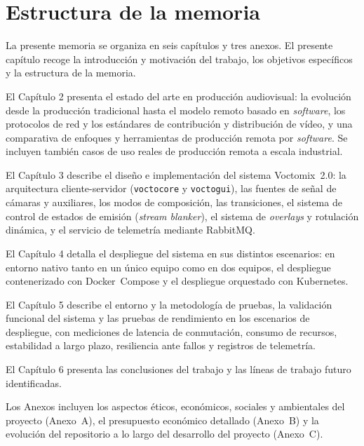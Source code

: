 \section{Estructura de la memoria}

La presente memoria se organiza en seis capítulos y tres anexos. El presente capítulo
recoge la introducción y motivación del trabajo, los objetivos específicos y la
estructura de la memoria.

El Capítulo 2 presenta el estado del arte en producción audiovisual: la
evolución desde la producción tradicional hasta el modelo remoto basado en \textit{software},
los protocolos de red y los estándares de contribución y distribución de vídeo, y una
comparativa de enfoques y herramientas de producción remota por \textit{software}. Se incluyen también casos de uso reales de
producción remota a escala industrial.

El Capítulo 3 describe el diseño e implementación del sistema Voctomix~2.0:
la arquitectura cliente-servidor (\texttt{voctocore} y \texttt{voctogui}), las fuentes de señal de
cámaras y auxiliares, los modos de composición, las transiciones, el sistema de control
de estados de emisión (\textit{stream blanker}), el sistema de \textit{overlays} y rotulación
dinámica, y el servicio de telemetría mediante RabbitMQ.

El Capítulo 4 detalla el despliegue del sistema en sus distintos escenarios: en entorno nativo tanto en un único equipo como en dos equipos, el despliegue contenerizado con Docker~Compose
y el despliegue orquestado con Kubernetes.

El Capítulo 5 describe el entorno y la metodología de pruebas, la validación funcional
del sistema y las pruebas de rendimiento en los escenarios de despliegue, con mediciones
de latencia de conmutación, consumo de recursos, estabilidad a largo plazo, resiliencia
ante fallos y registros de telemetría.

El Capítulo 6 presenta las conclusiones del trabajo y las líneas de trabajo
futuro identificadas.

Los Anexos incluyen los aspectos éticos, económicos, sociales y ambientales
del proyecto (Anexo~A), el presupuesto económico detallado (Anexo~B)
y la evolución del repositorio a lo largo del desarrollo del proyecto (Anexo~C).